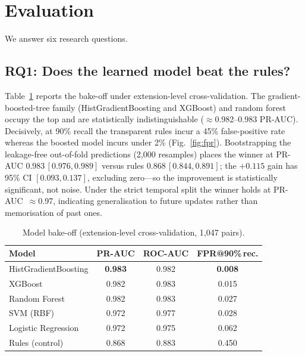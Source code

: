 \documentclass[conference]{IEEEtran}
\begin{document}
\section{Evaluation}
\label{sec:eval}
We answer six research questions.

\subsection{RQ1: Does the learned model beat the rules?}
Table~\ref{tab:bakeoff} reports the bake-off under extension-level cross-validation. The
gradient-boosted-tree family (HistGradientBoosting and XGBoost) and random forest occupy the top
and are statistically indistinguishable ($\approx$0.982--0.983 PR-AUC). Decisively, at 90\% recall
the transparent rules incur a 45\% false-positive rate whereas the boosted model incurs under 2\%
(Fig.~\ref{fig:fpr}). Bootstrapping the leakage-free out-of-fold predictions (2{,}000 resamples)
places the winner at PR-AUC $0.983\,[0.976, 0.989]$ versus rules $0.868\,[0.844, 0.891]$; the
$+0.115$ gain has 95\% CI $[0.093, 0.137]$, excluding zero---so the improvement is statistically
significant, not noise. Under the strict temporal split the winner holds at PR-AUC~$\approx$0.97,
indicating generalisation to future updates rather than memorisation of past ones.

\begin{table}[t]
\caption{Model bake-off (extension-level cross-validation, 1{,}047 pairs).}
\label{tab:bakeoff}
\centering
\footnotesize
\begin{tabular}{@{}lccc@{}}
\toprule
\textbf{Model} & \textbf{PR-AUC} & \textbf{ROC-AUC} & \textbf{FPR@90\%\,rec.} \\
\midrule
HistGradientBoosting & \textbf{0.983} & 0.982 & \textbf{0.008} \\
XGBoost & 0.982 & 0.983 & 0.015 \\
Random Forest & 0.982 & 0.983 & 0.027 \\
SVM (RBF) & 0.972 & 0.977 & 0.028 \\
Logistic Regression & 0.972 & 0.975 & 0.062 \\
Rules (control) & 0.868 & 0.883 & 0.450 \\
\bottomrule
\end{tabular}
\end{table}
\end{document}
